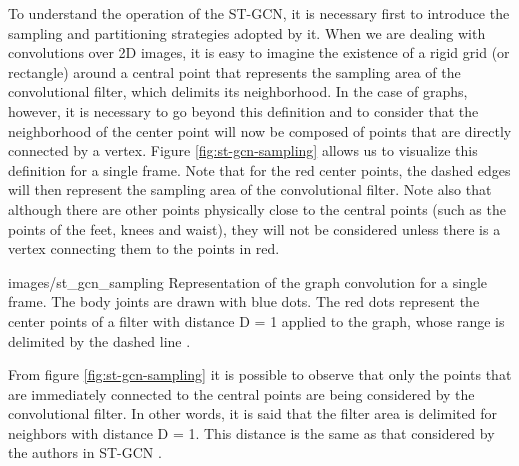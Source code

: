 
To understand the operation of the ST-GCN, it is necessary first to introduce the sampling and partitioning strategies adopted by it. When we are dealing with convolutions over 2D images, it is easy to imagine the existence of a rigid grid (or rectangle) around a central point that represents the sampling area of the convolutional filter, which delimits its neighborhood. In the case of graphs, however, it is necessary to go beyond this definition and to consider that the neighborhood of the center point will now be composed of points that are directly connected by a vertex. Figure \ref{fig:st-gcn-sampling} allows us to visualize this definition for a single frame. Note that for the red center points, the dashed edges will then represent the sampling area of the convolutional filter. Note also that although there are other points physically close to the central points (such as the points of the feet, knees and waist), they will not be considered unless there is a vertex connecting them to the points in red.


    {images/st_gcn_sampling}
    {Representation of the graph convolution for a single frame. The body joints are drawn with blue dots. The red dots represent the center points of a filter with distance D = 1 applied to the graph, whose range is delimited by the dashed line \cite[p. 5]{st-gcn-2018}.}

From figure \ref{fig:st-gcn-sampling} it is possible to observe that only the points that are immediately connected to the central points are being considered by the convolutional filter. In other words, it is said that the filter area is delimited for neighbors with distance D = 1. This distance is the same as that considered by the authors in ST-GCN \cite{st-gcn-2018}.

